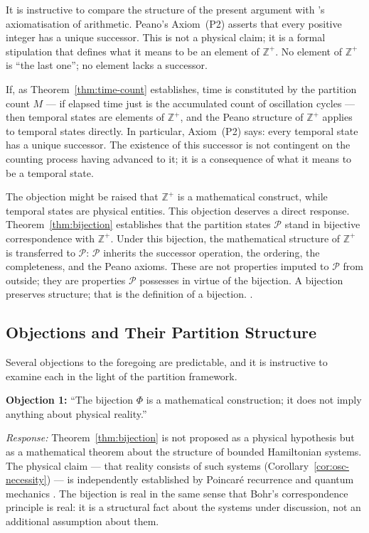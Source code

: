 \documentclass[twocolumn,10pt,a4paper]{article}
\theoremstyle{thmstyle}
\theoremstyle{definition}
\theoremstyle{remark}
\newcommand{\Zp}{\mathbb{Z}^{+}}
\newcommand{\Parts}{\mathcal{P}}
\newcommand{\PhiMap}{\varPhi}
\begin{document}
It is instructive to compare the structure of the present argument with \citet{peano1889}'s axiomatisation of arithmetic. Peano's Axiom~(P2) asserts that every positive integer has a unique successor. This is not a physical claim; it is a formal stipulation that defines what it means to be an element of $\Zp$. No element of $\Zp$ is ``the last one''; no element lacks a successor.

If, as Theorem~\ref{thm:time-count} establishes, time is constituted by the partition count $M$ --- if elapsed time just is the accumulated count of oscillation cycles --- then temporal states are elements of $\Zp$, and the Peano structure of $\Zp$ applies to temporal states directly. In particular, Axiom~(P2) says: every temporal state has a unique successor. The existence of this successor is not contingent on the counting process having advanced to it; it is a consequence of what it means to be a temporal state.

The objection might be raised that $\Zp$ is a mathematical construct, while temporal states are physical entities. This objection deserves a direct response. Theorem~\ref{thm:bijection} establishes that the partition states $\Parts$ stand in bijective correspondence with $\Zp$. Under this bijection, the mathematical structure of $\Zp$ is transferred to $\Parts$: $\Parts$ inherits the successor operation, the ordering, the completeness, and the Peano axioms. These are not properties imputed to $\Parts$ from outside; they are properties $\Parts$ possesses in virtue of the bijection. A bijection preserves structure; that is the definition of a bijection. \citep{cantor1874,cantor1891,dedekind1888}.

\subsection{Objections and Their Partition Structure}

Several objections to the foregoing are predictable, and it is instructive to examine each in the light of the partition framework.

\textbf{Objection 1:} ``The bijection $\PhiMap$ is a mathematical construction; it does not imply anything about physical reality.''

\textit{Response:} Theorem~\ref{thm:bijection} is not proposed as a physical hypothesis but as a mathematical theorem about the structure of bounded Hamiltonian systems. The physical claim --- that reality consists of such systems (Corollary~\ref{cor:osc-necessity}) --- is independently established by Poincar\'e recurrence and quantum mechanics \citep{poincare1890,penrose1989}. The bijection is real in the same sense that Bohr's correspondence principle is real: it is a structural fact about the systems under discussion, not an additional assumption about them.
\end{document}
